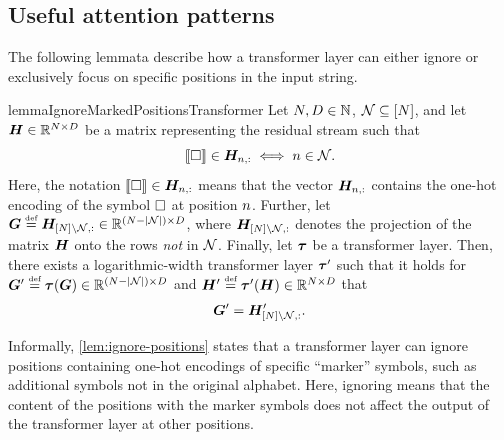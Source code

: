 \subsection{Useful attention patterns} \label{app:indexing-positions}
The following lemmata describe how a transformer layer can either ignore or exclusively focus on specific positions in the input string.
\begin{restatable}{lemma}{IgnoreMarkedPositionsTransformer} \label{lem:ignore-positions}
   Let ${{N}}, {{D}} \in {{\mathbb{N}}}$, ${{{\mathcal{N}}}} \subseteq {\left[ {{N}}\right]}$, and let ${{{{{{{\bm{H}}}}}}}} \in {{\mathbb{R}}}^{{{N}} \times {{D}}}$ be a matrix representing the residual stream such that
   \begin{equation} \label{eq:ignore-positions-condition}
      {{\llbracket{\square}\rrbracket}} \in {{{{{{{\bm{H}}}}}}}}_{{{n}}, :} \iff {{n}} \in {{{\mathcal{N}}}}.
   \end{equation}
   Here, the notation ${{\llbracket{\square}\rrbracket}} \in {{{{{{{\bm{H}}}}}}}}_{{{n}}, :}$ means that the vector ${{{{{{{\bm{H}}}}}}}}_{{{n}}, :}$ contains the one-hot encoding of the symbol ${\square}$ at position ${{n}}$.
   Further, let ${{{\bm{G}}}} \mathrel{\stackrel{\textnormal{\tiny def}}{=}} {{{{{{{\bm{H}}}}}}}}_{{\left[ {{N}} \right]} \setminus {{{\mathcal{N}}}}, :} \in {{\mathbb{R}}}^{({{N}} - |{{{\mathcal{N}}}}|) \times {{D}}}$, where ${{{{{{{\bm{H}}}}}}}}_{{\left[ {{N}} \right]} \setminus {{{\mathcal{N}}}}, :}$ denotes the projection of the matrix ${{{{{{{\bm{H}}}}}}}}$ onto the rows \emph{not} in ${{{\mathcal{N}}}}$.
   Finally, let ${{\boldsymbol{\tau}}}$ be a transformer layer.
   Then, there exists a logarithmic-width transformer layer ${{\boldsymbol{\tau}}}'$ such that it holds for ${{{\bm{G}}}}' \mathrel{\stackrel{\textnormal{\tiny def}}{=}} {{\boldsymbol{\tau}}}({{{\bm{G}}}}) \in {{\mathbb{R}}}^{({{N}} - |{{{\mathcal{N}}}}|) \times {{D}}}$ and ${{{{{{{\bm{H}}}}}}}}' \mathrel{\stackrel{\textnormal{\tiny def}}{=}} {{\boldsymbol{\tau}}}'({{{{{{{\bm{H}}}}}}}}) \in {{\mathbb{R}}}^{{{N}} \times {{D}}}$ that
   \begin{equation}
      {{{\bm{G}}}}' = {{{{{{{\bm{H}}}}}}}}'_{{\left[ {{N}} \right]} \setminus {{{\mathcal{N}}}}, :}.
   \end{equation}
\end{restatable}
Informally, \cref{lem:ignore-positions} states that a transformer layer can ignore positions containing one-hot encodings of specific ``marker'' symbols, such as additional symbols not in the original alphabet.
Here, ignoring means that the content of the positions with the marker symbols does not affect the output of the transformer layer at other positions.
